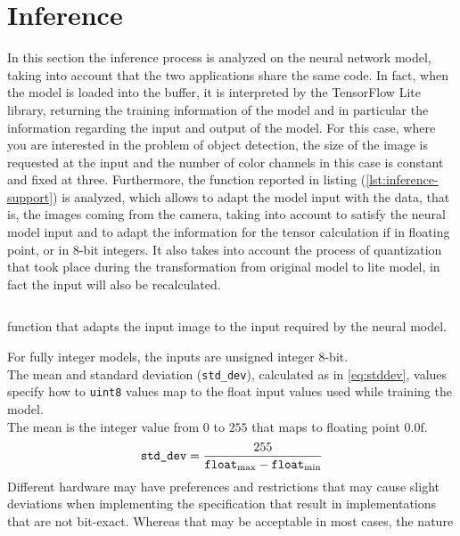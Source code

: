\section{Inference}
\label{sec:soft-inference}
%
%
In this section the inference process is analyzed on the neural network model,
taking into account that the two applications share the same code. In fact, when
the model is loaded into the buffer, it is interpreted by the TensorFlow Lite
library, returning the training information of the model and in particular the
information regarding the input and output of the model.
For this case, where you are interested in the problem of object detection, the
size of the image is requested at the input and the number of color channels in
this case is constant and fixed at three.
Furthermore, the function reported in listing (\ref{lst:inference-support}) is
analyzed, which allows to adapt the model input with the data, that is, the
images coming from the camera, taking into account to satisfy the neural model
input and to adapt the information for the tensor calculation if in floating
point, or in 8-bit integers.
It also takes into account the process of quantization that took place during
the transformation from original model to lite model, in fact the input will
also be recalculated.
%
%
\begin{listing}[!h] 
\inputminted[frame=lines,framesep=2mm, linenos=true, autogobble, breaklines=true, fontsize=\scriptsize, firstline=29, lastline=70]{c++}{software/code/model_support_function.hpp} 
\caption{function that adapts the input image to the input required by the neural model.} 
\label{lst:inference-support} 
\end{listing}
%
%
For fully integer models, the inputs are unsigned integer 8-bit.\\ 
The mean and standard deviation (\texttt{std\_dev}), calculated as in
\eqref{eq:stddev}, values specify how to \texttt{uint8} values map to the float
input values used while training the model.\\
The mean is the integer value from $0$ to $255$ that maps to floating point
\texttt{$0.0\text{f}$}. 
\begin{equation}
\label{eq:stddev}
\text{\texttt{std\_dev}} = \frac{255}{\text{\texttt{float}}_\text{max}-\text{\texttt{float}}_\text{min}}
\end{equation}
Different hardware may have preferences and restrictions that may cause slight
deviations when implementing the specification that result in implementations
that are not bit-exact. Whereas that may be acceptable in most cases, the nature
